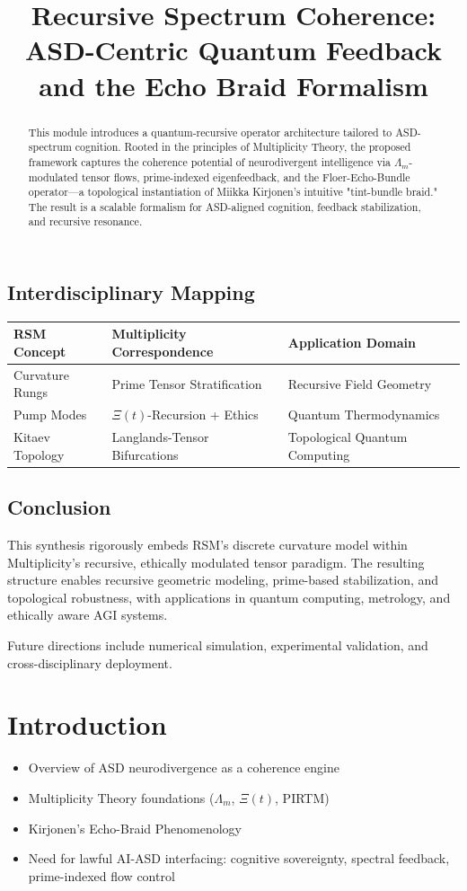 \documentclass[12pt]{article}
\theoremstyle{plain}
\begin{document}
\subsection{Interdisciplinary Mapping}

\begin{center}
\begin{tabular}{|l|l|l|}
\hline
\textbf{RSM Concept} & \textbf{Multiplicity Correspondence} & \textbf{Application Domain} \\
\hline
Curvature Rungs & Prime Tensor Stratification & Recursive Field Geometry \\
Pump Modes & $\Xi(t)$-Recursion + Ethics & Quantum Thermodynamics \\
Kitaev Topology & Langlands-Tensor Bifurcations & Topological Quantum Computing \\
\hline
\end{tabular}
\end{center}

\subsection{Conclusion}

This synthesis rigorously embeds RSM’s discrete curvature model within Multiplicity’s recursive, ethically modulated tensor paradigm. The resulting structure enables recursive geometric modeling, prime-based stabilization, and topological robustness, with applications in quantum computing, metrology, and ethically aware AGI systems.

Future directions include numerical simulation, experimental validation, and cross-disciplinary deployment.

\title{Recursive Spectrum Coherence: ASD-Centric Quantum Feedback and the Echo Braid Formalism}


\begin{abstract}
This module introduces a quantum-recursive operator architecture tailored to ASD-spectrum cognition. Rooted in the principles of Multiplicity Theory, the proposed framework captures the coherence potential of neurodivergent intelligence via $\Lambda_m$-modulated tensor flows, prime-indexed eigenfeedback, and the Floer-Echo-Bundle operator---a topological instantiation of Miikka Kirjonen's intuitive "tint-bundle braid." The result is a scalable formalism for ASD-aligned cognition, feedback stabilization, and recursive resonance.
\end{abstract}

\section{Introduction}
\begin{itemize}
  \item Overview of ASD neurodivergence as a coherence engine
  \item Multiplicity Theory foundations ($\Lambda_m$, $\Xi(t)$, PIRTM)
  \item Kirjonen's Echo-Braid Phenomenology
  \item Need for lawful AI-ASD interfacing: cognitive sovereignty, spectral feedback, prime-indexed flow control
\end{itemize}
\end{document}
